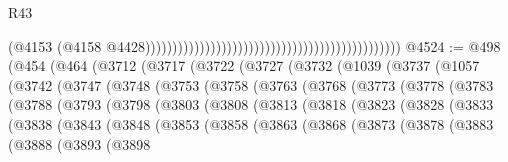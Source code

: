 \begin{lexlean}{R43}
\begin{coremodule}
                                                                                              (@4153
                                                                                                (@4158
                                                                                                  @4428)))))))))))))))))))))))))))))))))))))))))))))))
@4524 := @498
    (@454
      (@464
        (@3712
          (@3717
            (@3722
              (@3727
                (@3732
                  (@1039
                    (@3737
                      (@1057
                        (@3742
                          (@3747
                            (@3748
                              (@3753
                                (@3758
                                  (@3763
                                    (@3768
                                      (@3773
                                        (@3778
                                          (@3783
                                            (@3788
                                              (@3793
                                                (@3798
                                                  (@3803
                                                    (@3808
                                                      (@3813
                                                        (@3818
                                                          (@3823
                                                            (@3828
                                                              (@3833
                                                                (@3838
                                                                  (@3843
                                                                    (@3848
                                                                      (@3853
                                                                        (@3858
                                                                          (@3863
                                                                            (@3868
                                                                              (@3873
                                                                                (@3878
                                                                                  (@3883
                                                                                    (@3888
                                                                                      (@3893
                                                                                        (@3898

\end{coremodule}
\end{lexlean}
